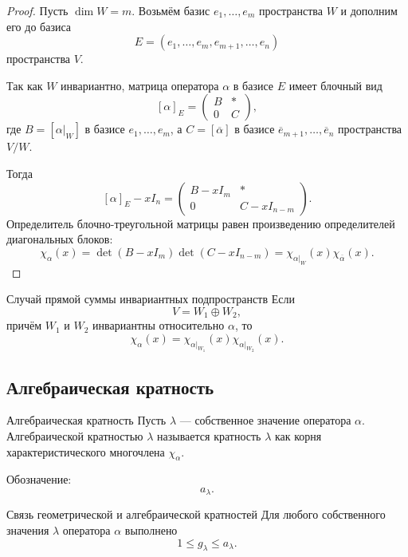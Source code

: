 \begin{proof}
	Пусть $\dim W=m$.
	Возьмём базис $e_1,\ldots,e_m$ пространства $W$ и дополним его до базиса
	\[
	E=(e_1,\ldots,e_m,e_{m+1},\ldots,e_n)
	\]
	пространства $V$.
	
	Так как $W$ инвариантно, матрица оператора $\alpha$ в базисе $E$ имеет блочный вид
	\[
	[\alpha]_E=
	\begin{pmatrix}
		B & *\\
		0 & C
	\end{pmatrix},
	\]
	где $B=[\alpha|_W]$ в базисе $e_1,\ldots,e_m$, а $C=[\overline{\alpha}]$ в базисе
	$\overline e_{m+1},\ldots,\overline e_n$ пространства $V/W$.
	
	Тогда
	\[
	[\alpha]_E-xI_n=
	\begin{pmatrix}
		B-xI_m & *\\
		0 & C-xI_{n-m}
	\end{pmatrix}.
	\]
	Определитель блочно-треугольной матрицы равен произведению определителей диагональных блоков:
	\[
	\chi_\alpha(x)
	=
	\det(B-xI_m)\det(C-xI_{n-m})
	=
	\chi_{\alpha|_W}(x)\chi_{\overline{\alpha}}(x).
	\]
\end{proof}

\begin{Corollary}{Случай прямой суммы инвариантных подпространств}{}
	Если
	\[
	V=W_1\oplus W_2,
	\]
	причём $W_1$ и $W_2$ инвариантны относительно $\alpha$, то
	\[
	\chi_\alpha(x)
	=
	\chi_{\alpha|_{W_1}}(x)\chi_{\alpha|_{W_2}}(x).
	\]
\end{Corollary}

\subsection{Алгебраическая кратность}

\begin{Definition}{Алгебраическая кратность}{}
	Пусть $\lambda$ --- собственное значение оператора $\alpha$.
	Алгебраической кратностью $\lambda$ называется кратность $\lambda$ как корня
	характеристического многочлена $\chi_\alpha$.
	
	Обозначение:
	\[
	a_\lambda.
	\]
\end{Definition}

\begin{Theorem}{Связь геометрической и алгебраической кратностей}{}
	Для любого собственного значения $\lambda$ оператора $\alpha$ выполнено
	\[
	1\le g_\lambda\le a_\lambda.
	\]
\end{Theorem}

